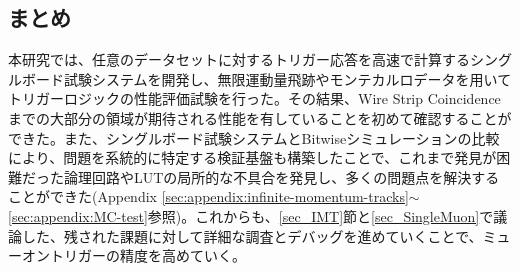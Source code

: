\subsection*{まとめ}
本研究では、任意のデータセットに対するトリガー応答を高速で計算するシングルボード試験システムを開発し、無限運動量飛跡やモンテカルロデータを用いてトリガーロジックの性能評価試験を行った。その結果、Wire Strip Coincidenceまでの大部分の領域が期待される性能を有していることを初めて確認することができた。また、シングルボード試験システムとBitwiseシミュレーションの比較により、問題を系統的に特定する検証基盤も構築したことで、これまで発見が困難だった論理回路やLUTの局所的な不具合を発見し、多くの問題点を解決することができた(Appendix \ref{sec:appendix:infinite-momentum-tracks}$\sim$ \ref{sec:appendix:MC-test}参照)。これからも、\ref{sec_IMT}節と\ref{sec_SingleMuon}で議論した、残された課題に対して詳細な調査とデバッグを進めていくことで、ミューオントリガーの精度を高めていく。




